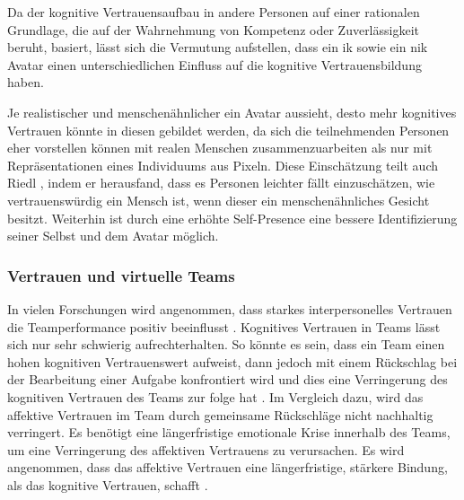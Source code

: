 \documentclass[a4paper,11pt]{article}%
\renewcommand{\\}{\vspace*{0.5\baselineskip} \newline}
\begin{document}
Da der kognitive Vertrauensaufbau in andere Personen auf einer rationalen Grundlage, die auf der Wahrnehmung von Kompetenz oder Zuverlässigkeit beruht, basiert, lässt sich die Vermutung aufstellen, dass ein \ac{ik} sowie ein \ac{nik} Avatar einen unterschiedlichen Einfluss auf die kognitive Vertrauensbildung haben.

Je realistischer und menschenähnlicher ein Avatar aussieht, desto mehr kognitives Vertrauen könnte in diesen gebildet werden, da sich die teilnehmenden Personen eher vorstellen können mit realen Menschen zusammenzuarbeiten als nur mit Repräsentationen eines Individuums aus Pixeln. Diese Einschätzung teilt auch Riedl \cite{riedl2014trusting}, indem er herausfand, dass es Personen leichter fällt einzuschätzen, wie vertrauenswürdig ein Mensch ist, wenn dieser ein menschenähnliches Gesicht besitzt.
Weiterhin ist durch eine erhöhte Self-Presence eine bessere Identifizierung seiner Selbst und dem Avatar möglich. 


	\subsubsection{Vertrauen und virtuelle Teams}
	\label{Vertrauen und virtuelle Teams}
In vielen Forschungen wird angenommen, dass starkes interpersonelles Vertrauen die Teamperformance positiv beeinflusst \citep{mcallister1995affect} \citep{mayer1995integrative} \citep{dirks2002trust}.
Kognitives Vertrauen in Teams lässt sich nur sehr schwierig aufrechterhalten. So könnte es sein, dass ein Team einen hohen kognitiven Vertrauenswert aufweist, dann jedoch mit einem Rückschlag bei der Bearbeitung einer Aufgabe konfrontiert wird und dies eine Verringerung des kognitiven Vertrauen des Teams zur folge hat \citep[p.29-31]{mcallister1995affect}.
Im Vergleich dazu, wird das affektive Vertrauen im Team durch gemeinsame Rückschläge nicht nachhaltig verringert. Es benötigt eine längerfristige emotionale Krise innerhalb des Teams, um eine Verringerung des affektiven Vertrauens zu verursachen. Es wird angenommen, dass das affektive Vertrauen eine längerfristige, stärkere Bindung, als das kognitive Vertrauen, schafft \citep[p.29-31]{mcallister1995affect}.
\end{document}
